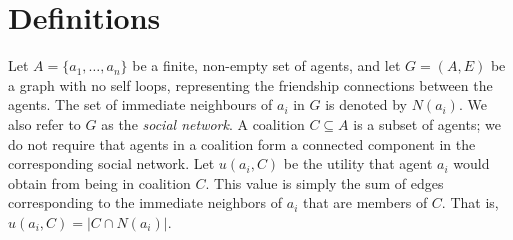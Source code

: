 \documentclass{article}
\def\tuple#1{( #1 )}
\begin{document}





\section{Definitions}
\label{sec:defn}
Let $A=\{a_{1},\ldots ,a_{n}\}$ be a finite, non-empty set of agents, and let $G=\tuple{A,E}$ be a graph with no self loops, representing the friendship connections between the agents.
The set of immediate neighbours of $a_{i}$ in $G$ is denoted by $N(a_{i})$.
We also refer to $G$ as the \emph{social network}. A coalition $C\subseteq A$ is a subset of agents; we do not require that agents in a coalition form a connected component in the corresponding social network.
Let $u(a_i,C)$ be the utility that agent $a_i$ would obtain from being in coalition $C$. This value is simply the sum of edges corresponding to the immediate neighbors of $a_i$ that are members of $C$. That is,
$ u(a_{i},C)=|C\cap N(a_{i})|$.
\end{document}
